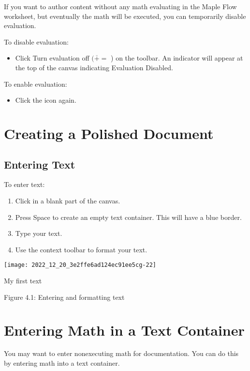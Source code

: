 If you want to author content without any math evaluating in the Maple Flow worksheet, but eventually the math will be executed, you can temporarily disable evaluation.

To disable evaluation:

\begin{itemize}
  \item Click Turn evaluation off $(\overline{+}=$ ) on the toolbar. An indicator will appear at the top of the canvas indicating Evaluation Disabled.
\end{itemize}

To enable evaluation:

\begin{itemize}
  \item Click the icon again.
\end{itemize}

\section{Creating a Polished Document}
\subsection{Entering Text}
To enter text:

\begin{enumerate}
  \item Click in a blank part of the canvas.

  \item Press Space to create an empty text container. This will have a blue border.

  \item Type your text.

  \item Use the context toolbar to format your text.

\end{enumerate}

\begin{center}
\texttt{[image: 2022\_12\_20\_3e2ffe6ad124ec91ee5cg-22]}
\end{center}

My first text

Figure 4.1: Entering and formatting text

\section{Entering Math in a Text Container}
You may want to enter nonexecuting math for documentation. You can do this by entering math into a text container.


